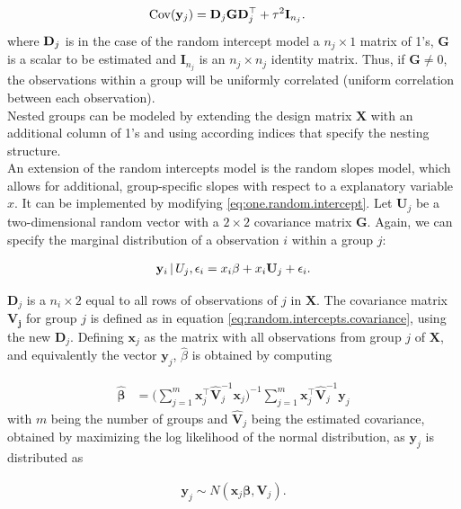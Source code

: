 \documentclass[11pt,a4paper,twoside]{book}\usepackage[]{graphicx}\usepackage[]{color}
\begin{document}
\begin{align}
\operatorname{Cov}(\mathbf{y}_j) &= \mathbf{D}_j \mathbf{G} \mathbf{D}_j^\top + \tau^2 \mathbf{I}_{n_j}. \label{eq:random.intercepts.covariance}
\end{align}
where ${\mathbf{D}}_j$ is in the case of the random intercept model a $n_j \times 1$ matrix of 1's, $\mathbf{G}$ is a scalar to be estimated and $\mathbf{I}_{n_j}$ is an $n_j \times n_j$ identity matrix. Thus, if $\mathbf{G} \neq 0$, the observations within a group will be uniformly correlated (uniform correlation between each observation). \\
Nested groups can be modeled by extending the design matrix $\mathbf{X}$ with an additional column of 1's and using according indices that specify the nesting structure.\\
An extension of the random intercepts model is the random slopes model, which allows for additional, group-specific slopes with respect to a explanatory variable $x$. It can be implemented by modifying \eqref{eq:one.random.intercept}. Let $\mathbf{U}_j$ be a two-dimensional random vector with a $2 \times 2$ covariance matrix $\mathbf{G}$. Again, we can specify the marginal distribution of a observation $i$ within a group $j$:

\begin{align}
\mathbf{y}_i \,\vert\, U_j,\epsilon_i =  x_i\beta + x_i \mathbf{U}_j + \epsilon_i. \label{eq:one.random.intercept.and.slope}
\end{align}

$\mathbf{D}_j$ is a $n_i \times 2$ equal to all rows of observations of $j$ in $\mathbf{X}$. The covariance matrix $\mathbf{V_j}$ for group $j$ is defined as in equation \eqref{eq:random.intercepts.covariance}, using the new $\mathbf{D}_j$. Defining $\mathbf{x}_j$ as the matrix with all observations from group $j$ of $\mathbf{X}$, and equivalently the vector $\mathbf{y}_j$, $\hat{\beta}$ is obtained by computing

\begin{align}
\hat{\mathbf{\beta}} &= \Big( \sum_{j = 1}^m \mathbf{x}_j^\top \hat{\mathbf{V}}_j^{-1} \mathbf{x}_j \Big)^{-1} \sum_{j = 1}^m \mathbf{x}_j^\top \hat{\mathbf{V}}_j^{-1} \mathbf{y}_j
\end{align}
with $m$ being the number of groups and $\hat{\mathbf{V}}_j$ being the estimated covariance, obtained by maximizing the log likelihood of the normal distribution, as $\mathbf{y}_j$ is distributed as

\begin{align}
\mathbf{y}_j \sim N(\mathbf{x}_j \mathbf{\beta}, \mathbf{V}_j). \nonumber
\end{align}
\end{document}
